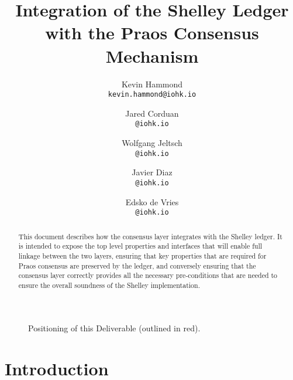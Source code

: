 \documentclass[11pt,a4paper,dvipsnames,twosided,final]{article}
\begin{document}

  \cleardoublepage%
  \tableofcontents%
  \listoffigures%
  \clearpage%

  \begin{changelog}
      \end{changelog}
      \clearpage%
\begin{landscape}
\begin{figure*}
\caption{Positioning of this Deliverable (outlined in red).}
\end{figure*}
\end{landscape}
\pagestyle{empty}
\cleardoublepage


\title{Integration of the Shelley Ledger with the Praos Consensus Mechanism}

\author{
     Kevin Hammond  \\ {\small \texttt{kevin.hammond@iohk.io}} \\
\and Jared Corduan  \\ {\small \texttt{@iohk.io}} \\
\and Wolfgang Jeltsch  \\ {\small \texttt{@iohk.io}} \\
\and Javier Diaz  \\ {\small \texttt{@iohk.io}} \\
\and Edsko de Vries  \\ {\small \texttt{@iohk.io}}
}

\maketitle

\begin{abstract}
  \noindent
  This document describes how the consensus layer integrates with the Shelley ledger.
  It is intended to expose the top level properties and interfaces that will enable
  full linkage between the two layers, ensuring that key properties that are required
  for Praos consensus are preserved by the ledger, and conversely ensuring that the consensus
  layer correctly provides all the necessary pre-conditions that are needed to ensure
  the overall soundness of the Shelley implementation.
\end{abstract}

\thispagestyle{empty}
\clearpage
\pagestyle{myheadings}
\renewcommand{\thepage}{\arabic{page}}
\setcounter{page}{1}
\section{Introduction}
\label{sec:introduction}

\clearpage



\clearpage
\appendix

\end{document}
